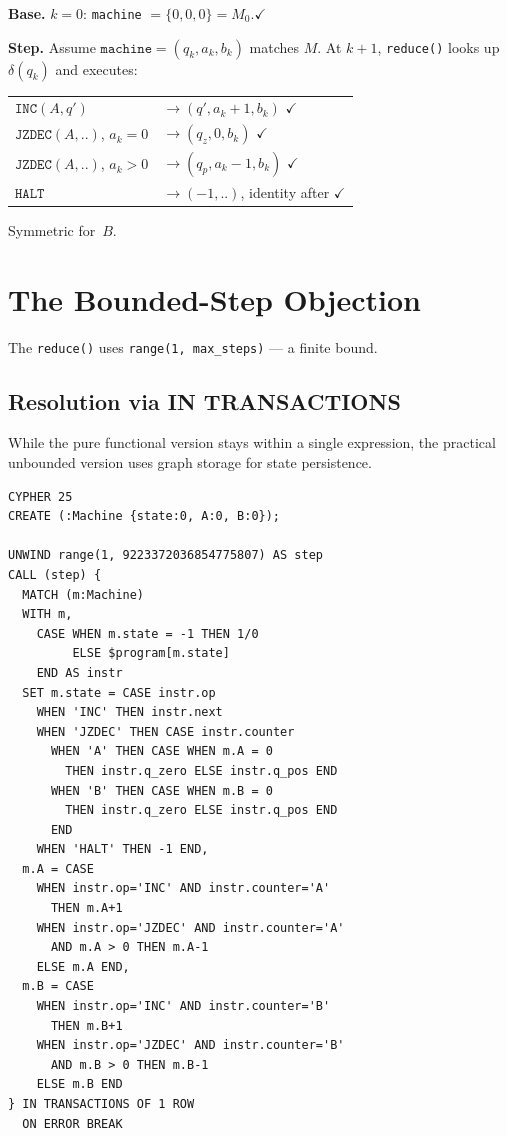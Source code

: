 \documentclass[9pt,a4paper,twocolumn]{article}
\begin{document}
\begin{sproof}
\textbf{Base.} $k{=}0$: \texttt{machine} $= \{0,0,0\} = M_0$.\enspace$\checkmark$

\textbf{Step.} Assume $\texttt{machine} = (q_k, a_k, b_k)$ matches $M$.
At $k{+}1$, \texttt{reduce()} looks up $\delta(q_k)$ and executes:

{\small
\begin{tabular}{@{}ll@{}}
$\texttt{INC}(A,q')$ & $\to (q', a_k{+}1, b_k)$ \enspace$\checkmark$ \\
$\texttt{JZDEC}(A,..)$, $a_k{=}0$ & $\to (q_z, 0, b_k)$ \enspace$\checkmark$ \\
$\texttt{JZDEC}(A,..)$, $a_k{>}0$ & $\to (q_p, a_k{-}1, b_k)$ \enspace$\checkmark$ \\
$\texttt{HALT}$ & $\to (-1, ..)$, identity after \enspace$\checkmark$ \\
\end{tabular}}

\noindent Symmetric for~$B$.
\end{sproof}

\section{The Bounded-Step Objection}

The \texttt{reduce()} uses \texttt{range(1, max\_steps)} ---
a finite bound.

\subsection{Resolution via IN TRANSACTIONS}

While the pure functional version stays within a single expression,
the practical unbounded version uses graph storage for state persistence.


\begin{smallcode}
\begin{lstlisting}[style=cypher-dense]
CYPHER 25
CREATE (:Machine {state:0, A:0, B:0});

UNWIND range(1, 9223372036854775807) AS step
CALL (step) {
  MATCH (m:Machine)
  WITH m,
    CASE WHEN m.state = -1 THEN 1/0
         ELSE $program[m.state]
    END AS instr
  SET m.state = CASE instr.op
    WHEN 'INC' THEN instr.next
    WHEN 'JZDEC' THEN CASE instr.counter
      WHEN 'A' THEN CASE WHEN m.A = 0
        THEN instr.q_zero ELSE instr.q_pos END
      WHEN 'B' THEN CASE WHEN m.B = 0
        THEN instr.q_zero ELSE instr.q_pos END
      END
    WHEN 'HALT' THEN -1 END,
  m.A = CASE
    WHEN instr.op='INC' AND instr.counter='A'
      THEN m.A+1
    WHEN instr.op='JZDEC' AND instr.counter='A'
      AND m.A > 0 THEN m.A-1
    ELSE m.A END,
  m.B = CASE
    WHEN instr.op='INC' AND instr.counter='B'
      THEN m.B+1
    WHEN instr.op='JZDEC' AND instr.counter='B'
      AND m.B > 0 THEN m.B-1
    ELSE m.B END
} IN TRANSACTIONS OF 1 ROW
  ON ERROR BREAK
\end{lstlisting}
\end{smallcode}
\end{document}

